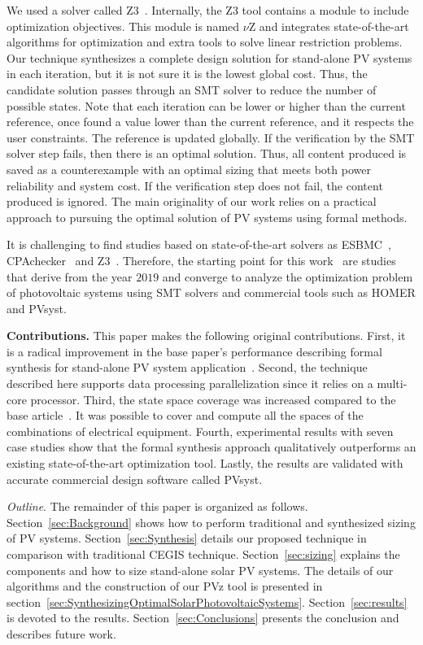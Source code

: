 \documentclass[review]{elsarticle}
\begin{document}
We used a solver called Z3~\citep{BjornerPF15}. Internally, the Z3 tool contains a module to include optimization objectives. This module is named $\nu$Z and integrates state-of-the-art algorithms for optimization and extra tools to solve linear restriction problems. Our technique synthesizes a complete design solution for stand-alone PV systems in each iteration, but it is not sure it is the lowest global cost. Thus, the candidate solution passes through an SMT solver to reduce the number of possible states.  Note that each iteration can be lower or higher than the current reference, once found a value lower than the current reference, and it respects the user constraints. The reference is updated globally. If the verification by the SMT solver step fails, then there is an optimal solution. Thus, all content produced is saved as a counterexample with an optimal sizing that meets both power reliability and system cost. If the verification step does not fail, the content produced is ignored. The main originality of our work relies on a practical approach to pursuing the optimal solution of PV systems using formal methods. 
 
It is challenging to find studies based on state-of-the-art solvers as ESBMC~\citep{esbmc2018}, CPAchecker~\citep{Beyer2011} and Z3~\citep{BjornerPF15}. Therefore, the starting point for this work~\citep{VSTTE2020, TrindadeCordeiro19, AraujoBCF16} are studies that derive from the year $2019$ and converge to analyze the optimization problem of photovoltaic systems using SMT solvers and commercial tools such as HOMER and PVsyst. 

\noindent \textbf{Contributions.} This paper makes the following original contributions. First, it is a radical improvement in the base paper's performance describing formal synthesis for stand-alone PV system application~\citep{DBLP:journals/corr/abs-1909-13139}. Second, the technique described here supports data processing parallelization since it relies on a multi-core processor. Third, the state space coverage was increased compared to the base article~\citep{VSTTE2020}. It was possible to cover and compute all the spaces of the combinations of electrical equipment. Fourth, experimental results with seven case studies show that the formal synthesis approach qualitatively outperforms an existing state-of-the-art optimization tool. Lastly, the results are validated with accurate commercial design software called PVsyst.

\noindent \textit{Outline}. The remainder of this paper is organized as follows. Section~\ref{sec:Background} shows how to perform traditional and synthesized sizing of PV systems. Section~\ref{sec:Synthesis} details our proposed technique in comparison with traditional CEGIS technique. Section~\ref{sec:sizing} explains the components and how to size stand-alone solar PV systems. The details of our algorithms and the construction of our PVz tool is presented in section~\ref{sec:SynthesizingOptimalSolarPhotovoltaicSystems}. Section~\ref{sec:results} is devoted to the results. Section~\ref{sec:Conclusions} presents the conclusion and describes future work.
\end{document}
